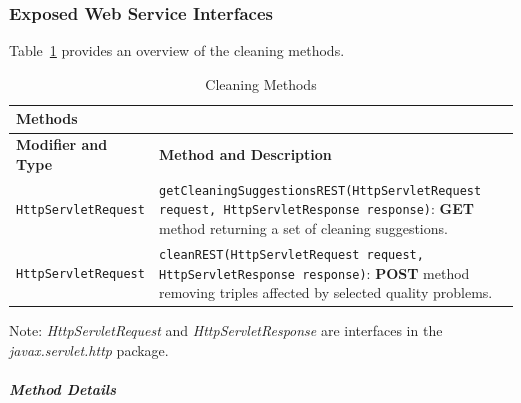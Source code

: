 \subsubsection{Exposed Web Service Interfaces}
\label{sec:service-API}

Table~\ref{tbl:valid_meth} provides an overview of the cleaning methods.

\begin{table}[h]
\captionsetup{justification=raggedright,singlelinecheck=false}
\caption{Cleaning Methods}
\label{tbl:valid_meth}
\begin{tabular}{|p{5cm}|p{10cm}|}
\hline
\multicolumn{2}{|l|}{\textbf{Methods}} \\ \hline

\textbf{Modifier and Type} & 
\textbf{Method and Description} \\ \hline

\texttt{HttpServletRequest} & 
\texttt{getCleaningSuggestionsREST(HttpServletRequest
request, HttpServletResponse response)}: \textbf{GET} method returning a set of cleaning suggestions. \\ \hline

\texttt{HttpServletRequest} & 
\texttt{cleanREST(HttpServletRequest
request, HttpServletResponse response)}: \textbf{POST} method removing triples affected by selected quality problems. \\ \hline

\hline
\end{tabular}
\end{table}
Note: \textit{HttpServletRequest} and \textit{HttpServletResponse} are interfaces in the \textit{javax.servlet.http} package.

\subparagraph{Method Details}

